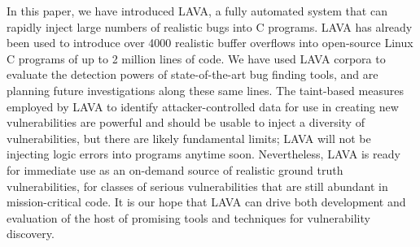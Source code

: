In this paper, we have introduced LAVA, a fully automated system that can rapidly inject large numbers of realistic bugs into C programs.
LAVA has already been used to introduce over 4000 realistic buffer overflows into open-source Linux C programs of up to 2 million lines of code.  
We have used LAVA corpora to evaluate the detection powers of state-of-the-art bug finding tools, and are planning future investigations along these same lines.
The taint-based measures employed by LAVA to identify attacker-controlled data for use in creating new vulnerabilities are powerful and should be usable to inject a diversity of vulnerabilities, but there are likely fundamental limits; LAVA will not be injecting logic errors into programs anytime soon.
Nevertheless, LAVA is ready for immediate use as an on-demand source of realistic ground truth vulnerabilities, for classes of serious vulnerabilities that are still abundant in mission-critical code.
It is our hope that LAVA can drive both development and evaluation of the host of promising tools and techniques for vulnerability discovery.



